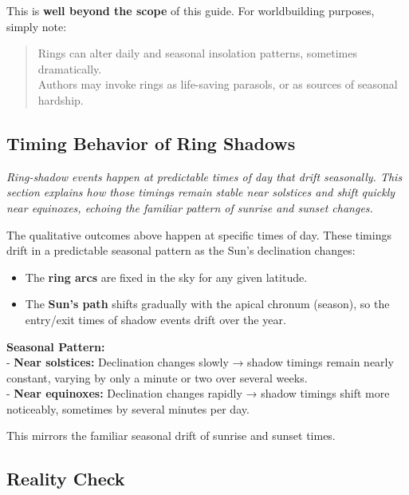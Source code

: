 \documentclass[
  letterpaper,
]{book}
\providecommand{\tightlist}{%
  \setlength{\itemsep}{0pt}\setlength{\parskip}{0pt}}
\begin{document}
This is \textbf{well beyond the scope} of this guide. For worldbuilding
purposes, simply note:

\begin{quote}
Rings can alter daily and seasonal insolation patterns, sometimes
dramatically.\\
Authors may invoke rings as life-saving parasols, or as sources of
seasonal hardship.
\end{quote}

\subsection{\texorpdfstring{\textbf{Timing Behavior of Ring
Shadows}}{Timing Behavior of Ring Shadows}}\label{timing-behavior-of-ring-shadows}

\emph{Ring-shadow events happen at predictable times of day that drift
seasonally. This section explains how those timings remain stable near
solstices and shift quickly near equinoxes, echoing the familiar pattern
of sunrise and sunset changes.}

The qualitative outcomes above happen at specific times of day. These
timings drift in a predictable seasonal pattern as the Sun's declination
changes:

\begin{itemize}
\tightlist
\item
  The \textbf{ring arcs} are fixed in the sky for any given latitude.\\
\item
  The \textbf{Sun's path} shifts gradually with the apical chronum
  (season), so the entry/exit times of shadow events drift over the
  year.
\end{itemize}

\textbf{Seasonal Pattern:}\\
- \textbf{Near solstices:} Declination changes slowly → shadow timings
remain nearly constant, varying by only a minute or two over several
weeks.\\
- \textbf{Near equinoxes:} Declination changes rapidly → shadow timings
shift more noticeably, sometimes by several minutes per day.

This mirrors the familiar seasonal drift of sunrise and sunset times.

\subsection{\texorpdfstring{\textbf{Reality
Check}}{Reality Check}}\label{reality-check}
\end{document}
